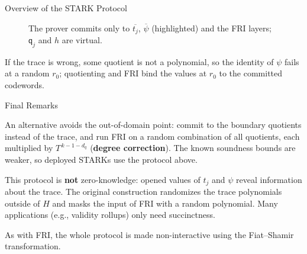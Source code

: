 \documentclass{zkdl-presentation-template}
\begin{document}
\begin{frame}{Overview of the STARK Protocol}
\begin{figure}
{%
            }
            \caption{The prover commits only to $\overline{t_j}$, $\overline{\psi}$ (highlighted) and the FRI layers; $\mathsf{q}_j$ and $h$ are virtual.}
        \end{figure}
        \pause[3]
        If the trace is wrong, some quotient is not a polynomial, so the identity of $\psi$ fails at a random $r_0$; quotienting and FRI bind the values at $r_0$ to the committed codewords.
    \end{frame}

    \begin{frame}{Final Remarks}
        \begin{remark}
            An alternative avoids the out-of-domain point: commit to the boundary quotients instead of the trace, and run FRI on a random combination of all quotients, each multiplied by $T^{\,k - 1 - d_q}$ (\textbf{degree correction}). The known soundness bounds are weaker, so deployed STARKs use the protocol above.
        \end{remark}
        \pause

        \begin{remark}
            This protocol is \textbf{not} zero-knowledge: opened values of $t_j$ and $\psi$ reveal information about the trace. The original construction randomizes the trace polynomials outside of $H$ and masks the input of FRI with a random polynomial. Many applications (e.g., validity rollups) only need succinctness.
        \end{remark}
        \pause

        \begin{remark}
            As with FRI, the whole protocol is made non-interactive using the Fiat--Shamir transformation.
        \end{remark}
    \end{frame}
\end{document}
